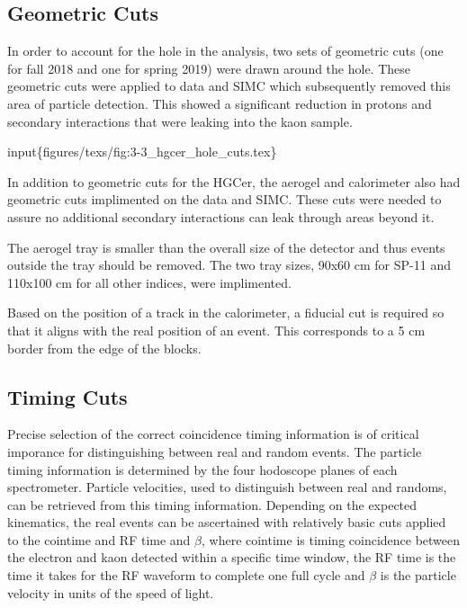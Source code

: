 \documentclass[
]{report}
\begin{document}


\hypertarget{geometric-cuts}{%
\subsection{\texorpdfstring{Geometric Cuts
\label{Chapter-5-3-2}}{Geometric Cuts }}\label{geometric-cuts}}

In order to account for the hole in the analysis, two sets of geometric
cuts (one for fall 2018 and one for spring 2019) were drawn around the
hole. These geometric cuts were applied to data and SIMC which
subsequently removed this area of particle detection. This showed a
significant reduction in protons and secondary interactions that were
leaking into the kaon sample.

input\{figures/texs/fig:3-3\_hgcer\_hole\_cuts.tex\}

In addition to geometric cuts for the HGCer, the aerogel and calorimeter
also had geometric cuts implimented on the data and SIMC. These cuts
were needed to assure no additional secondary interactions can leak
through areas beyond it.

The aerogel tray is smaller than the overall size of the detector and
thus events outside the tray should be removed. The two tray sizes,
90x60 cm for SP-11 and 110x100 cm for all other indices, were
implimented.

Based on the position of a track in the calorimeter, a fiducial cut is
required so that it aligns with the real position of an event. This
corresponds to a 5 cm border from the edge of the blocks.

\hypertarget{timing-cuts}{%
\subsection{Timing Cuts}\label{timing-cuts}}

Precise selection of the correct coincidence timing information is of
critical imporance for distinguishing between real and random events.
The particle timing information is determined by the four hodoscope
planes of each spectrometer. Particle velocities, used to distinguish
between real and randoms, can be retrieved from this timing information.
Depending on the expected kinematics, the real events can be ascertained
with relatively basic cuts applied to the cointime and RF time and
\(\beta\), where cointime is timing coincidence between the electron and
kaon detected within a specific time window, the RF time is the time it
takes for the RF waveform to complete one full cycle and \(\beta\) is
the particle velocity in units of the speed of light.
\end{document}
